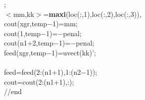 {\begin{flushleft}
{\cmarg \hspace{0.5cm}{\bf end};\\ 
\cmarg \hspace{0.5cm}$<$mm,kk$>$={\bf maxi}(loc(:,1),loc(:,2),loc(:,3)),\\ 
\cmarg \hspace{0.5cm}cout(xgr,temp$-$1)=mm;\\ 
\cmarg \hspace{0.5cm}cout(1,temp$-$1)=$-$penal;\\ 
\cmarg \hspace{0.5cm}cout(n1+2,temp$-$1)=$-$penal;\\ 
\cmarg \hspace{0.5cm}feed(xgr,temp$-$1)=uvect(kk)';\\ 
\\ 
\cmarg feed=feed(2:(n1+1),1:(n2$-$1));\\ 
\cmarg cout=cout(2:(n1+1),:);\\ 
\cmarg //end}
\end{flushleft}}



\def\Mtrajopt{
\begin{flushleft}
{\sl 
\cmarg //$<$$>$=trajopt(feed)\\ 
\cmarg //$<$$>$=trajopt(feed)\\ 
\cmarg \verb@// feed est la matrice de feedback calculee par mine @\\ 
\cmarg \verb@// trajopt calcule et dessine la trajectoire et le controle @\\ 
\cmarg \verb@// optimaux pour un point de depart (1,1)@\\ 
\cmarg \verb@//!@\\ 
\cmarg $<$n1,n2$>$={\bf size}(feed)\\ 
\cmarg xopt=0$\star${\bf ones}(1,n2)\\ 
\cmarg uopt=0$\star${\bf ones}(1,n2+1)\\ 
\cmarg xopt(1)=1;\\ 
\cmarg {\bf for} i=2:(n2+1),xopt(i)=feed(xopt(i$-$1),i$-$1)+xopt(i$-$1),\\ 
\cmarg \hspace{3.2cm}uopt(i$-$1)=feed(xopt(i$-$1),i$-$1),{\bf end}\\ 
\cmarg plot2d($<$1:(n2+1);1:(n2+1)$>$',$<$uopt;$-$xopt$>$',$<$$-$1,$-$2$>$,"111",...\\ 
\cmarg \hspace{1.8cm}"commande optimale@trajectoire optimale",...\\ 
\cmarg \hspace{1.8cm}$<$1,$-$10,n2,2$>$);\\ 
\cmarg //end}
\end{flushleft}}




